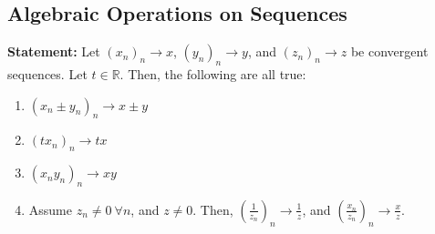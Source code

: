 \documentclass[10pt]{extarticle}
\newcommand{\R}{\mathbb{R}}
\begin{document}
  \subsection{Algebraic Operations on Sequences}%
  \textbf{Statement:} Let $(x_n)_n\rightarrow x$, $(y_n)_n\rightarrow y$, and $(z_n)_n\rightarrow z$ be convergent sequences. Let $t\in\R$. Then, the following are all true:
    \begin{enumerate}[(1)]
      \item $(x_n \pm y_n)_n \rightarrow x\pm y$
      \item $(tx_n)_n \rightarrow tx$
      \item $(x_ny_n)_n \rightarrow xy$
      \item Assume $z_n \neq 0~\forall n$, and $z\neq 0$. Then, $\left(\frac{1}{z_n}\right)_n \rightarrow \frac{1}{z}$, and $\left(\frac{x_n}{z_n}\right)_n \rightarrow \frac{x}{z}$.
    \end{enumerate}
\end{document}

